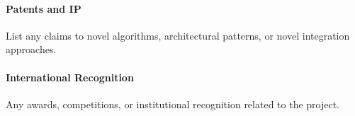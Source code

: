 \documentclass[11pt,a4paper]{article}
\begin{document}
\paragraph{Patents and IP}

List any claims to novel algorithms, architectural patterns, or novel integration approaches.

\paragraph{International Recognition}

Any awards, competitions, or institutional recognition related to the project.

\end{document}
